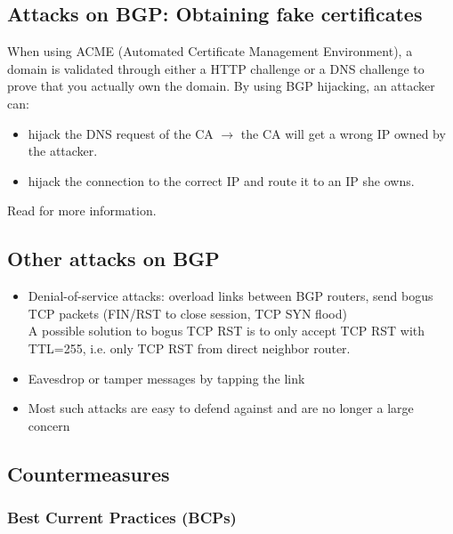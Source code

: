 \documentclass[11pt,oneside,a4paper]{article}
\begin{document}
\subsection{Attacks on BGP: Obtaining fake certificates}

When using ACME (Automated Certificate Management Environment), a domain is validated through either a HTTP challenge or a DNS challenge to prove that you actually own the domain. By using BGP hijacking, an attacker can:

\vspace{-\topsep}
\begin{itemize}
	\setlength{\itemsep}{0pt}
	\setlength{\parskip}{0pt}
	\item hijack the DNS request of the CA $\rightarrow$ the CA will get a wrong IP owned by the attacker.
	\item hijack the connection to the correct IP and route it to an IP she owns.
\end{itemize}
\vspace{-\topsep}

Read \cite{bgp_fake_cert} for more information.

\subsection{Other attacks on BGP}

\begin{itemize}
	\setlength{\itemsep}{0pt}
	\setlength{\parskip}{0pt}
	\item Denial-of-service attacks: overload links between BGP routers, send bogus TCP packets (FIN/RST to close session, TCP SYN flood)\\
	A possible solution to bogus TCP RST is to only accept TCP RST with TTL=255, i.e. only TCP RST from direct neighbor router.
	\item Eavesdrop or tamper messages by tapping the link
	\item Most such attacks are easy to defend against and are no longer a large concern
\end{itemize}
\vspace{-\topsep}

\newpage

\subsection{Countermeasures}

\subsubsection{Best Current Practices (BCPs)}
\end{document}
